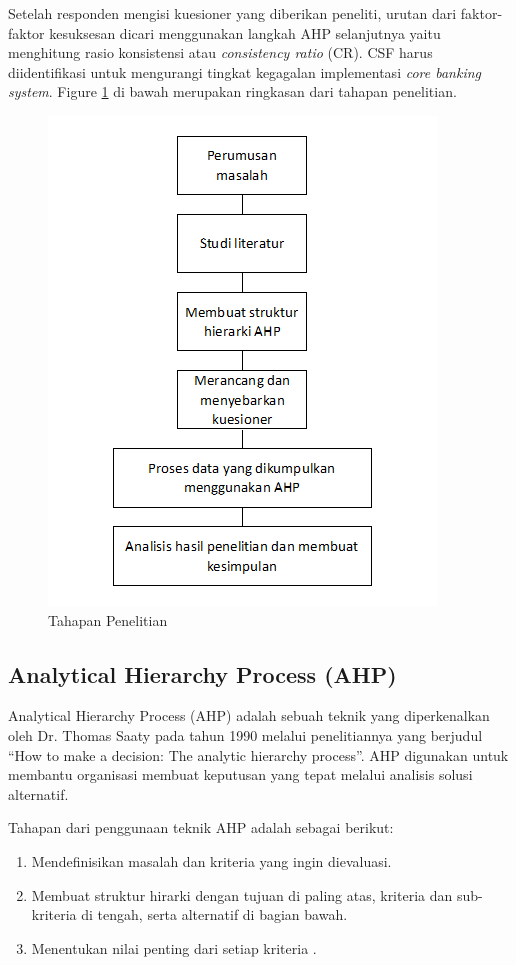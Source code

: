 \documentclass[journal,article,submit,pdftex,moreauthors]{Definitions/mdpi}
\begin{document}
Setelah responden mengisi kuesioner yang diberikan peneliti, urutan dari faktor-faktor kesuksesan dicari menggunakan langkah AHP selanjutnya yaitu menghitung rasio konsistensi atau \textit{consistency ratio} (CR). CSF harus diidentifikasi untuk mengurangi tingkat kegagalan implementasi \textit{core banking system}. Figure \ref{fig:tahapan-penelitian} di bawah merupakan ringkasan dari tahapan penelitian.

\begin{figure}[H]
\label{fig:tahapan-penelitian}
\includegraphics[width=6 cm]{attachments/tahapan.png}
\caption{Tahapan Penelitian}
\end{figure}   

\subsection{Analytical Hierarchy Process (AHP)}
Analytical Hierarchy Process (AHP) adalah sebuah teknik yang diperkenalkan oleh Dr. Thomas Saaty pada tahun 1990 melalui penelitiannya yang berjudul “How to make a decision: The analytic hierarchy process”. AHP digunakan untuk membantu organisasi membuat keputusan yang tepat melalui analisis solusi alternatif. 

Tahapan dari penggunaan teknik AHP adalah sebagai berikut:
\begin{enumerate}
    \item Mendefinisikan masalah dan kriteria yang ingin dievaluasi.
    \item Membuat struktur hirarki dengan tujuan di paling atas, kriteria dan sub-kriteria di tengah, serta alternatif di bagian bawah.
    \item Menentukan nilai penting dari setiap kriteria \cite{Jacob2021}.
\end{enumerate}
\end{document}
